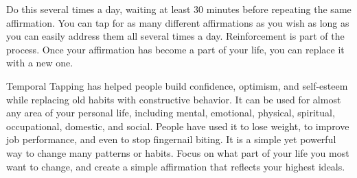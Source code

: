 \documentclass[../main.tex]{subfiles}
\begin{document}
Do this several times a day, waiting at least 30 minutes before repeating the same affirmation.
You can tap for as many different affirmations as you wish as long as you can easily address them all several times a day.
Reinforcement is part of the process. Once your affirmation has become a part of your life, you can replace it with a new one.

Temporal Tapping has helped people build confidence, optimism, and self-esteem while replacing old habits with constructive behavior.
It can be used for almost any area of your personal life, including mental, emotional, physical, spiritual, occupational, domestic, and social.
People have used it to lose weight, to improve job performance, and even to stop fingernail biting.
It is a simple yet powerful way to change many patterns or habits.
Focus on what part of your life you most want to change, and create a simple affirmation that reflects your highest ideals.
\end{document}
